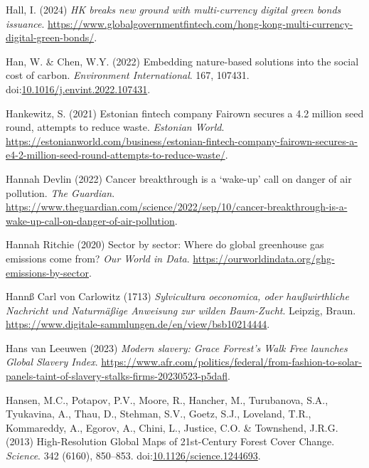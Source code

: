 \documentclass[
  letterpaper,
  DIV=11,
  numbers=noendperiod]{scrartcl}
\newlength{\cslhangindent}
\newenvironment{CSLReferences}[2] %
 {\begin{list}{}{%
  \setlength{\itemindent}{0pt}
  \setlength{\leftmargin}{0pt}
  \setlength{\parsep}{0pt}
  \ifodd #1
   \setlength{\leftmargin}{\cslhangindent}
   \setlength{\itemindent}{-1\cslhangindent}
  \fi
  \setlength{\itemsep}{#2\baselineskip}}}
 {\end{list}}
\begin{document}
\begin{CSLReferences}{0}{1}
Hall, I. (2024) \emph{{HK} breaks new ground with multi-currency digital
green bonds issuance}.
\url{https://www.globalgovernmentfintech.com/hong-kong-multi-currency-digital-green-bonds/}.

Han, W. \& Chen, W.Y. (2022) Embedding nature-based solutions into the
social cost of carbon. \emph{Environment International}. 167, 107431.
doi:\href{https://doi.org/10.1016/j.envint.2022.107431}{10.1016/j.envint.2022.107431}.

Hankewitz, S. (2021) Estonian fintech company {Fairown} secures a
{\texteuro}4.2 million seed round, attempts to reduce waste.
\emph{Estonian World}.
\url{https://estonianworld.com/business/estonian-fintech-company-fairown-secures-a-e4-2-million-seed-round-attempts-to-reduce-waste/}.

Hannah Devlin (2022) Cancer breakthrough is a {`wake-up'} call on danger
of air pollution. \emph{The Guardian}.
\url{https://www.theguardian.com/science/2022/sep/10/cancer-breakthrough-is-a-wake-up-call-on-danger-of-air-pollution}.

Hannah Ritchie (2020) Sector by sector: Where do global greenhouse gas
emissions come from? \emph{Our World in Data}.
\url{https://ourworldindata.org/ghg-emissions-by-sector}.

Hannß Carl von Carlowitz (1713) \emph{{Sylvicultura oeconomica, oder
hau{ß}wirthliche Nachricht und Naturm{ä}{ß}ige Anweisung zur wilden
Baum-Zucht}}. Leipzig, Braun.
\url{https://www.digitale-sammlungen.de/en/view/bsb10214444}.

Hans van Leeuwen (2023) \emph{Modern slavery: {Grace Forrest}'s {Walk
Free} launches {Global Slavery Index}}.
\url{https://www.afr.com/politics/federal/from-fashion-to-solar-panels-taint-of-slavery-stalks-firms-20230523-p5dafl}.

Hansen, M.C., Potapov, P.V., Moore, R., Hancher, M., Turubanova, S.A.,
Tyukavina, A., Thau, D., Stehman, S.V., Goetz, S.J., Loveland, T.R.,
Kommareddy, A., Egorov, A., Chini, L., Justice, C.O. \& Townshend,
J.R.G. (2013) High-{Resolution Global Maps} of 21st-{Century Forest
Cover Change}. \emph{Science}. 342 (6160), 850--853.
doi:\href{https://doi.org/10.1126/science.1244693}{10.1126/science.1244693}.


\end{CSLReferences}
\end{document}
